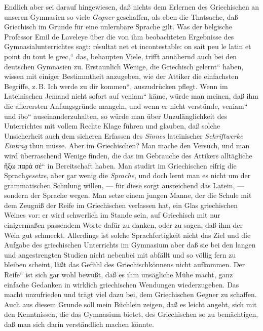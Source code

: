 Endlich aber sei darauf hingewiesen, daß nichts dem Erlernen des
Griechischen an unseren Gymnasien so viele \emph{Gegner} geschaffen,
als eben die Thatsache, daß Griechisch im Grunde für eine unlernbare
Sprache gilt. Was der belgische Professor Emil de Laveleye über die
von ihm beobachteten Ergebnisse des Gymnasialunterrichtes
sagt: \quotedblbase \textfrench{résultat net et incontestable: on
sait peu le latin et point du tout le grec,}`` das, behaupten Viele,
trifft annähernd auch bei den deutschen Gymnasien zu. Erstaunlich
Wenige, die \quotedblbase Griechisch gelernt`` haben, wissen mit
einiger Bestimmtheit anzugeben, wie der Attiker
die einfachsten Begriffe, z.\,B. \quotedblbase Ich werde zu dir
kommen``, auszudrücken pflegt. Wenn im Lateinischen
Jemand nicht sofort auf \quotedblbase \textlatin{veniam}`` käme,
würde man meinen, daß ihm die allerersten Anfangsgründe
mangeln, und wenn er nicht verstünde, \quotedblbase \textlatin{veniam}``
und \quotedblbase \textlatin{ibo}`` auseinanderzuhalten,
so würde man über Unzulänglichkeit des Unterrichtes mit vollem Rechte
Klage führen und glauben, daß solche Unsicherheit auch dem sicheren
Erfassen des \emph{Sinnes} lateinischer \emph{Schriftwerke Eintrag
}thun müsse. Aber  im Griechischen? Man mache den Versuch, und man
wird überraschend Wenige finden, die das im Gebrauche des Attikers
alltägliche \quotedblbase \textgreek[variant=ancient]{ἥξω παρὰ σέ}``
in Bereitschaft haben. Man
studirt im Griechischen eifrig die Sprach\emph{gesetze}, aber gar
wenig die \emph{Sprache}, und doch lernt man es nicht um der grammatischen
Schulung willen, --- für diese sorgt ausreichend
das Latein, --- sondern der Sprache wegen. Man setze einem jungen
Manne, der die Schule  mit dem Zeugniß der Reife im Griechischen
verlassen hat, ein Glas griechischen Weines vor: er wird schwerlich
im Stande sein, auf Griechisch mit nur einigermaßen passendem Worte
dafür zu danken, oder zu sagen, daß ihm der Wein gut schmeckt. Allerdings
ist solche Sprachfertigkeit nicht das Ziel und die Aufgabe des griechischen
Unterrichts im Gymnasium aber daß sie bei den langen und angestrengten
Studien nicht nebenbei mit abfällt und so völlig fern zu bleiben
scheint, läßt das Gefühl des Griechischkönnens nicht aufkommen. Der
\quotedblbase Reife`` ist sich gar wohl bewußt, daß es ihm unsägliche
Mühe macht, ganz einfache Gedanken in wirklich griechischen Wendungen
wiederzugeben. Das macht unzufrieden und trägt viel dazu bei, dem
Griechischen Gegner zu schaffen. Auch aus diesem Grunde soll mein
Büchlein zeigen, daß es leicht angeht, sich mit den Kenntnissen,
die das Gymnasium bietet, des Griechischen so zu bemächtigen, daß
man sich darin verständlich machen könnte. 

